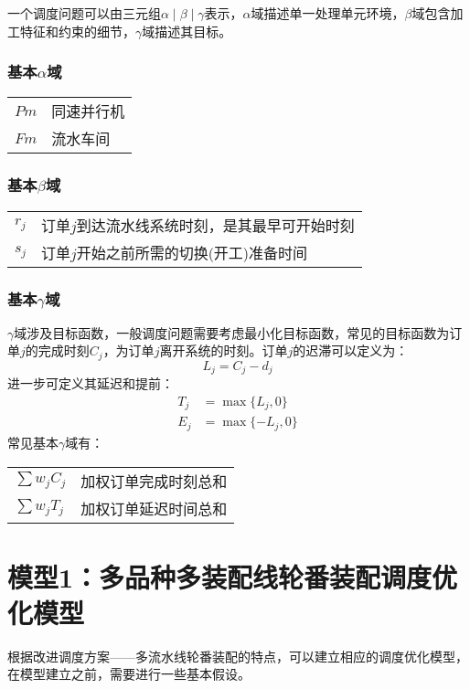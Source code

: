 一个调度问题可以由三元组$\alpha \mid \beta \mid \gamma$表示，$\alpha$域描述单一处理单元环境，$\beta$域包含加工特征和约束的细节，$\gamma$域描述其目标\cite{pinedo}。

\subsubsection{基本$\alpha$域}
\begin{supertabular}{ll}
$Pm$ & 同速并行机\\
$Fm$ & 流水车间\\
\end{supertabular}

\subsubsection{基本$\beta$域}
\begin{supertabular}{ll}
$r_j$ & 订单$j$到达流水线系统时刻，是其最早可开始时刻\\
$s_j$ & 订单$j$开始之前所需的切换(开工)准备时间\\
\end{supertabular}

\subsubsection{基本$\gamma$域}
$\gamma$域涉及目标函数，一般调度问题需要考虑最小化目标函数，常见的目标函数为订单$j$的完成时刻$C_j$，为订单$j$离开系统的时刻。订单$j$的迟滞可以定义为：
\[
L_j = C_j - d_j
\]
进一步可定义其延迟和提前：
\begin{align*}
T_j & = \max\{L_j,0\}\\
E_j & = \max\{-L_j,0\}
\end{align*}
常见基本$\gamma$域有：\\[3pt]
\begin{supertabular}{ll}
$\sum w_jC_j$ & 加权订单完成时刻总和 \\
$\sum w_jT_j$ & 加权订单延迟时间总和 \\
\end{supertabular}

\section{模型1：多品种多装配线轮番装配调度优化模型}
根据改进调度方案——多流水线轮番装配的特点，可以建立相应的调度优化模型，在模型建立之前，需要进行一些基本假设。
